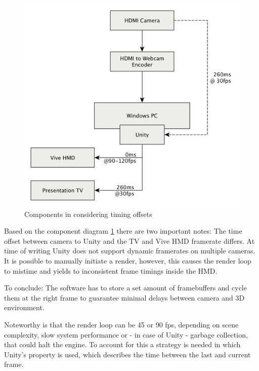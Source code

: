 \begin{figure}[htb]
	\includegraphics[width=\textwidth]{gfx/FPS-Timing-Components.png}
	\caption{Components in considering timing offsets}
	\label{fig:offsets:components}
\end{figure}

Based on the component diagram \ref{fig:offsets:components} there are two 
important notes: The time offset between camera to Unity and the TV and Vive 
HMD framerate differs. At time of writing Unity does not support dynamic 
framerates on multiple cameras. It is possible to manually initiate a render, 
however, this causes the render loop to mistime and yields to inconsistent 
frame timings inside the HMD.


To conclude: The software has to store a set amount of framebuffers and cycle 
them at the right frame to guarantee minimal delays between camera and 3D 
environment.
\newline

Noteworthy is that the render loop can be 45 or 90 fps, depending on scene 
complexity, slow system performance or - in case of Unity - garbage collection, 
that could halt the engine. To account for this a strategy is needed in which 
Unity's  property is used, which describes the time 
between the last and current frame.

